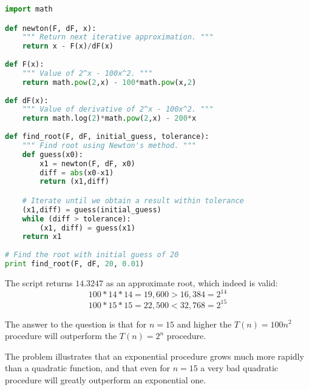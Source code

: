 \documentclass[a4paper,12pt]{article}
\begin{document}
\pagebreak
\begin{lstlisting}[language=Python]
import math

def newton(F, dF, x):
    """ Return next iterative approximation. """
    return x - F(x)/dF(x)
    
def F(x):
    """ Value of 2^x - 100x^2. """
    return math.pow(2,x) - 100*math.pow(x,2)
    
def dF(x):
    """ Value of derivative of 2^x - 100x^2. """
    return math.log(2)*math.pow(2,x) - 200*x
    
def find_root(F, dF, initial_guess, tolerance):
    """ Find root using Newton's method. """
    def guess(x0):
        x1 = newton(F, dF, x0)
        diff = abs(x0-x1)
        return (x1,diff)

    # Iterate until we obtain a result within tolerance                                                   
    (x1,diff) = guess(initial_guess)
    while (diff > tolerance):
        (x1, diff) = guess(x1)
    return x1
    
# Find the root with initial guess of 20                                                                                            
print find_root(F, dF, 20, 0.01)
\end{lstlisting}

The script returns $14.3247$ as an approximate root, which indeed is valid:
\[ 100 * 14 * 14 = 19,600 > 16,384 = 2^{14} \]
\[ 100 * 15 * 15 = 22,500 < 32,768 = 2^{15} \]

The answer to the question is that for $n=15$ and higher the $T(n) = 100n^2$ procedure will 
outperform the $T(n) = 2^n$ procedure. 

The problem illustrates that an exponential procedure 
grows much more rapidly than a quadratic function, 
and that even for $n = 15$ a very bad quadratic procedure will greatly outperform an exponential one.
\end{document}
